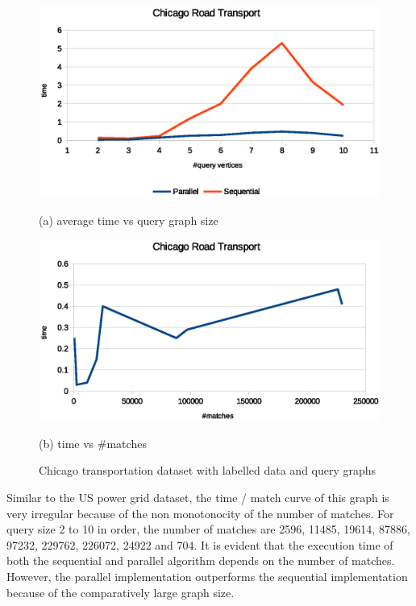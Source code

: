 \begin{figure}[h!]
    \centering
    \begin{minipage}[b]{.45\textwidth}
        \hspace*{-0.5in}
        \includegraphics[scale=0.55]{images/chicago_unlabelled.eps}
        \caption*{(a) average time vs query graph size}        
    \end{minipage} \hfill  
    \begin{minipage}[b]{.45\textwidth}
        \hspace*{-0.2in}
        \includegraphics[scale=0.55]{images/chicago_unlabelled_tpm.eps}
        \caption*{(b) time vs \#matches}       
    \end{minipage}   
\caption{Chicago transportation dataset with labelled data and query graphs}
\label{fig:distmx}
\end{figure}

Similar to the US power grid dataset, the time / match curve of this graph is very irregular because of the non monotonocity of the number of matches. For query size 2 to 10 in order, the number of matches are 2596, 11485, 19614, 87886, 97232, 229762, 226072, 24922 and 704. It is evident that the execution time of both the sequential and parallel algorithm depends on the number of matches. However, the parallel implementation outperforms the sequential implementation because of the comparatively large graph size.